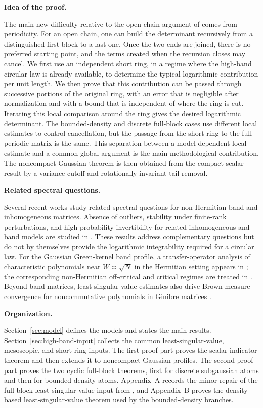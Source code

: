 \documentclass[11pt,reqno]{amsart}
\numberwithin{equation}{section}
\theoremstyle{definition}
\theoremstyle{remark}
\newcommand{\1}{\mathbf 1}
\newcommand{\introheading}[1]{%
  \par\medskip\noindent\textbf{#1.}\par\smallskip}
\begin{document}
\introheading{Idea of the proof}
The main new difficulty relative to the open-chain argument of
\cite{Han2511} comes from periodicity.  For an open chain, one can build
the determinant recursively from a distinguished first block to a last
one.  Once the two ends are joined, there is no preferred starting point,
and the terms created when the recursion closes may cancel.  We first use
an independent short ring, in a regime where the high-band circular law is
already available, to determine the typical logarithmic contribution per
unit length.  We then prove that this contribution can be passed through
successive portions of the original ring, with an error that is negligible
after normalization and with a bound that is independent of where the ring
is cut.  Iterating this local comparison around the ring gives the desired
logarithmic determinant.  The bounded-density and discrete full-block
cases use different local estimates to control cancellation, but the
passage from the short ring to the full periodic matrix is the same.  This
separation between a model-dependent local estimate and a common global
argument is the main methodological contribution.  The noncompact
Gaussian theorem is then obtained from the compact scalar result by a
variance cutoff and rotationally invariant tail removal.








\introheading{Related spectral questions}
Several recent works study related spectral questions for non-Hermitian
band and inhomogeneous matrices.  Absence of outliers, stability under
finite-rank perturbations, and high-probability invertibility for related
inhomogeneous and band models are studied in
\cite{Han2408Outliers,Han2507Invertibility}.  These results address
complementary questions but do not by themselves provide the logarithmic
integrability required for a circular law.  For the Gaussian Green-kernel
band profile, a transfer-operator analysis of characteristic
polynomials near \(W\asymp\sqrt N\) in the Hermitian setting appears in
\cite{Shcherbina2020}; the corresponding non-Hermitian off-critical and
critical regimes are treated in
\cite{ShcherbinaShcherbina2025,ShcherbinaShcherbina2604}.  Beyond band
matrices, least-singular-value estimates also drive Brown-measure
convergence for noncommutative polynomials in Ginibre matrices
\cite{Han2606Brown}.





\introheading{Organization}
Section~\ref{sec:model} defines the models and states the main results.
Section~\ref{sec:high-band-input} collects the common
least-singular-value, mesoscopic, and short-ring inputs.  The first proof
part proves the scalar indicator theorem and then extends it to
noncompact Gaussian profiles.  The second proof part proves the two
cyclic full-block theorems, first for discrete subgaussian atoms and then
for bounded-density atoms.  Appendix~A records
the minor repair of the full-block least-singular-value input from
\cite{JainJanaLuhORourke2021}, and Appendix~B proves the density-based
least-singular-value theorem used by the bounded-density branches.
\end{document}

